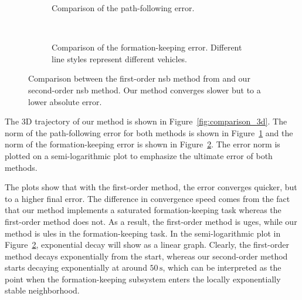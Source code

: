 \begin{figure}[htbp]
    \centering
    \begin{subfigure}[t]{.9\textwidth}
    \centering
    \setlength{}
    \setlength\figureheight{3cm}
    
    \vspace*{-2mm}
    \caption{Comparison of the path-following error.}
    \label{fig:nsb_comparison_path_following}
    \end{subfigure}
    \\
    \begin{subfigure}[t]{.9\textwidth}
    \centering
    \setlength{}
    \setlength\figureheight{3cm}
    
    \vspace*{-2mm}
    \caption{Comparison of the formation-keeping error. Different line styles represent different vehicles.}
    \label{fig:nsb_comparison_formation}
    \end{subfigure}
    \vspace*{-2mm}
    \caption{Comparison between the first-order \gls{nsb} method from \cite{matous_formation_2023} and our second-order \gls{nsb} method. Our method converges slower but to a lower absolute error.}
    \label{fig:nsb_comparison}
\end{figure}

The 3D trajectory of our method is shown in Figure~\ref{fig:comparison_3d}. The norm of the path-following error for both methods is shown in Figure~\ref{fig:nsb_comparison_path_following} and the norm of the formation-keeping error is shown in Figure~\ref{fig:nsb_comparison_formation}. The error norm is plotted on a semi-logarithmic plot to emphasize the ultimate error of both methods. %

The plots show that with the first-order method, the error converges quicker, but to a higher final error. The difference in convergence speed comes from the fact that our method implements a saturated formation-keeping task whereas the first-order method does not. As a result, the first-order method is \gls{uges}, while our method is \gls{ules} in the formation-keeping task. In the semi-logarithmic plot in Figure~\ref{fig:nsb_comparison_formation}, exponential decay will show as a linear graph. Clearly, the first-order method decays exponentially from the start, whereas our second-order method starts decaying exponentially at around $50\, \mathrm{s}$, which can be interpreted as the point when the formation-keeping subsystem enters the locally exponentially stable neighborhood.

